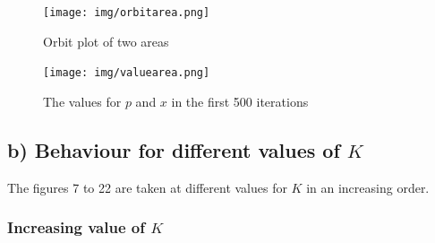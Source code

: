 \documentclass[a4paper,11pt]{article}
\begin{document}
\begin{figure}[H]
\centering
\texttt{[image: img/orbitarea.png]}
\caption{Orbit plot of two areas}
\label{areaorbit}
\end{figure}

\newpage
\begin{figure}[H]
\centering
\texttt{[image: img/valuearea.png]}
\caption{The values for $p$ and $x$ in the first 500 iterations}
\label{areaval}
\end{figure}

\subsection{b) Behaviour for different values of $K$}

The figures 7 to 22 are taken at different values for $K$ in an increasing order.

\subsubsection{Increasing value of $K$}
\end{document}
